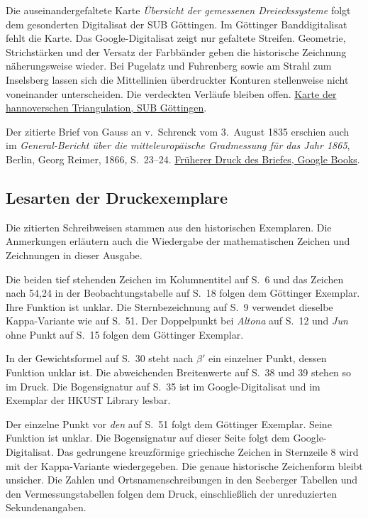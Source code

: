 Die auseinandergefaltete Karte \textit{Übersicht der gemessenen Dreieckssysteme} folgt
dem gesonderten Digitalisat der SUB Göttingen. Im Göttinger
Banddigitalisat fehlt die Karte. Das Google-Digitalisat zeigt nur
gefaltete Streifen. Geometrie, Strichstärken und der Versatz der
Farbbänder geben die historische Zeichnung näherungsweise wieder.
Bei Pugelatz und Fuhrenberg sowie am Strahl zum Inselsberg lassen sich
die Mittellinien überdruckter Konturen stellenweise nicht voneinander
unterscheiden. Die verdeckten Verläufe bleiben offen.
\href{https://webdoc.sub.gwdg.de/ebook/e/2005/gausscd/html/kapitel_landv_karte.htm}{Karte der hannoverschen Triangulation, SUB Göttingen}.

Der zitierte Brief von Gauss an v.~Schrenck vom 3.~August 1835
erschien auch im \emph{General-Bericht über die mitteleuropäische
Gradmessung für das Jahr 1865}, Berlin, Georg Reimer, 1866, S.~23--24.
\href{https://books.google.com/books?id=VBNDAAAAcAAJ\&pg=PA24}{Früherer Druck des Briefes, Google Books}.

\subsection*{Lesarten der Druckexemplare}

Die zitierten Schreibweisen stammen aus den historischen Exemplaren. Die Anmerkungen erläutern auch die Wiedergabe der mathematischen Zeichen und Zeichnungen in dieser Ausgabe.

Die beiden tief stehenden Zeichen im Kolumnentitel auf S.~6 und das
Zeichen nach 54,24 in der Beobachtungstabelle auf S.~18 folgen dem
Göttinger Exemplar. Ihre Funktion ist unklar. Die Sternbezeichnung
auf S.~9 verwendet dieselbe Kappa-Variante wie auf S.~51. Der
Doppelpunkt bei \emph{Altona} auf S.~12 und \emph{Jun} ohne Punkt
auf S.~15 folgen dem Göttinger Exemplar.

In der Gewichtsformel auf S.~30 steht nach \(\beta'\) ein einzelner
Punkt, dessen Funktion unklar ist. Die abweichenden Breitenwerte auf
S.~38 und 39 stehen so im Druck. Die Bogensignatur auf S.~35 ist im
Google-Digitalisat und im Exemplar der HKUST Library lesbar.

Der einzelne Punkt vor \emph{den} auf S.~51 folgt dem Göttinger
Exemplar. Seine Funktion ist unklar. Die Bogensignatur auf dieser
Seite folgt dem Google-Digitalisat. Das gedrungene kreuzförmige
griechische Zeichen in Sternzeile 8 wird mit der Kappa-Variante
wiedergegeben. Die genaue historische Zeichenform bleibt unsicher.
Die Zahlen und Ortsnamenschreibungen in den Seeberger Tabellen und
den Vermessungstabellen folgen dem Druck, einschließlich der
unreduzierten Sekundenangaben.

